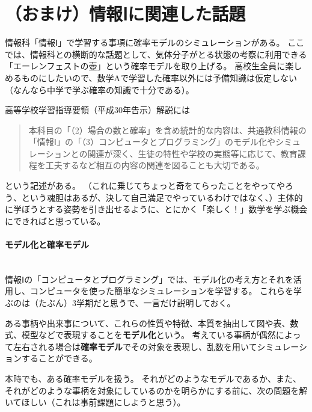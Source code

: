 \documentclass[luatexja,fontsize=12pt]{jlreq}\usepackage{ifthen}\newcounter{enlarge}\setcounter{enlarge}{1}
\begin{document}
\section*{（おまけ）情報Ⅰに関連した話題}

情報科「情報Ⅰ」で学習する事項に確率モデルのシミュレーションがある。
ここでは、情報科との横断的な話題として、気体分子がとる状態の考察に利用できる「エーレンフェストの壺」という確率モデルを取り上げる。
高校生全員に楽しめるものにしたいので、数学Aで学習した確率以外には予備知識は仮定しない（なんなら中学で学ぶ確率の知識で十分である）。

高等学校学習指導要領（平成30年告示）解説には
\begin{quotation}
本科目の「（2）場合の数と確率」を含め統計的な内容は、共通教科情報の「情報Ⅰ」の「（3）コンピュータとプログラミング」のモデル化やシミュレーションとの関連が深く、生徒の特性や学校の実態等に応じて、教育課程を工夫するなど相互の内容の関連を図ることも大切である。
\end{quotation}
という記述がある。
（これに乗じてちょっと奇をてらったことをやってやろう、という魂胆はあるが、決して自己満足でやっているわけではなく、）主体的に学ぼうとする姿勢を引き出せるように、とにかく「楽しく！」数学を学ぶ機会にできればと思っている。
\mbox{}\\

\paragraph{モデル化と確率モデル}\mbox{}\\
\indent
情報Ⅰの「コンピュータとプログラミング」では、モデル化の考え方とそれを活用し、コンピュータを使った簡単なシミュレーションを学習する。
これらを学ぶのは（たぶん）3学期だと思うで、一言だけ説明しておく。

ある事柄や出来事について、これらの性質や特徴、本質を抽出して図や表、数式、模型などで表現することを\textbf{モデル化}という。
考えている事柄が偶然によって左右される場合は\textbf{確率モデル}でその対象を表現し、乱数を用いてシミュレーションすることができる。

本時でも、ある確率モデルを扱う。
それがどのようなモデルであるか、また、それがどのような事柄を対象にしているのかを明らかにする前に、次の問題を解いてほしい（これは事前課題にしようと思う）。
\mbox{}\\
\end{document}
